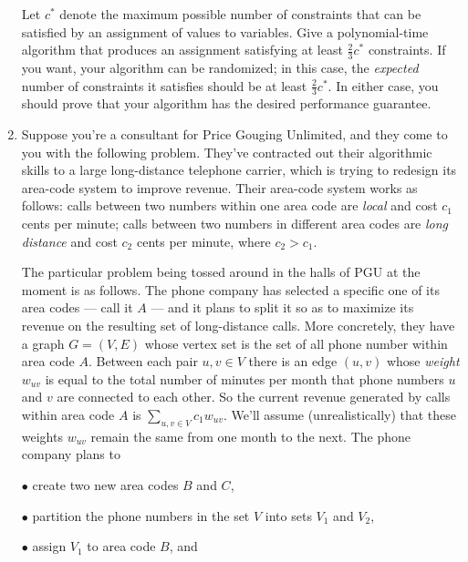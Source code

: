 \documentclass[12pt]{article}
\begin{document}
\begin{enumerate}
Let $c^*$ denote the maximum possible number of constraints
that can be satisfied by an assignment of values to variables.
Give a polynomial-time algorithm that produces an
assignment satisfying at least $\frac23 c^*$ constraints.
If you want, your algorithm can be randomized;
in this case, the {\em expected} number of constraints
it satisfies should be at least $\frac23 c^*$.
In either case, you should prove that your algorithm
has the desired performance guarantee.





\item 

Suppose you're a consultant for
Price Gouging Unlimited, and they come to you with
the following problem.
They've contracted out their algorithmic skills
to a large long-distance telephone carrier,
which is trying to redesign its area-code system to improve revenue.
Their area-code system works as follows:
calls between two numbers within one area code are {\em local}
and cost $c_1$ cents per minute; calls between two numbers
in different area codes are {\em long distance} and cost
$c_2$ cents per minute, where $c_2 > c_1$.

The particular problem being tossed around in the
halls of PGU at the moment is as follows.
The phone company has selected a specific one of its area codes
--- call it $A$ ---
and it plans to split it so as to maximize its revenue on
the resulting set of long-distance calls.
More concretely, they have a graph $G = (V,E)$ whose vertex set
is the set of all phone number within area code $A$.
Between each pair $u, v \in V$ there is an edge $(u,v)$
whose {\em weight} $w_{uv}$ is equal to the total number of
minutes per month that phone numbers $u$ and $v$ are connected
to each other.  So the current revenue generated by calls
within area code $A$ is $\sum_{u,v \in V} c_1 w_{uv}$.
We'll assume (unrealistically) that these weights $w_{uv}$
remain the same from one month to the next.
The phone company plans to

$\bullet$ create two new area codes $B$ and $C$,

$\bullet$ partition the phone numbers in the set $V$ into sets $V_1$ and $V_2$,

$\bullet$ assign $V_1$ to area code $B$, and


\end{enumerate}
\end{document}
